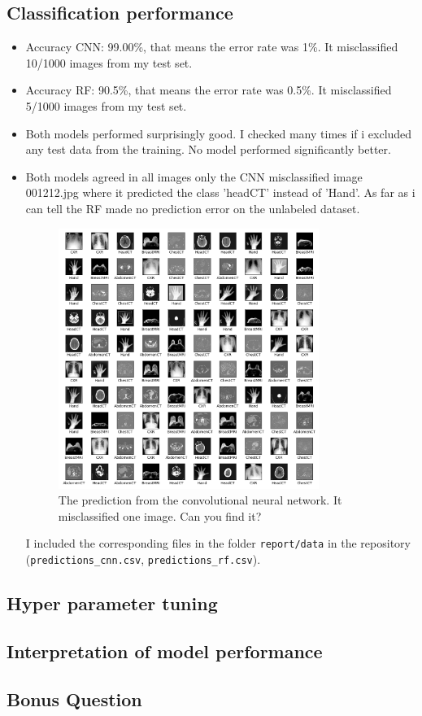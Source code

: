 \documentclass[]{article}
\begin{document}
	\subsection{Classification performance}
	\begin{itemize}
		\item Accuracy CNN: 99.00\%, that means the error rate was 1\%. It misclassified 10/1000 images from my test set.
		\item Accuracy RF: 90.5\%, that means the error rate was 0.5\%. It misclassified 5/1000 images from my test set.
		\item Both models performed surprisingly good. I checked many times if i excluded any test data from the training. No model performed significantly better.
		\item Both models agreed in all images only the CNN misclassified image 001212.jpg where it predicted the class 'headCT' instead of 'Hand'. As far as i can tell the RF made no prediction error on the unlabeled dataset.
		\begin{figure}
			\centering
			\includegraphics[width=0.8\textwidth]{images/pred_img_cnn.png}
			\caption{The prediction from the convolutional neural network. It misclassified one image. Can you find it?}
			\label{fig:pred_img}
		\end{figure}
		I included the corresponding files in the folder \texttt{report/data} in the repository (\texttt{predictions\_cnn.csv}, \texttt{predictions\_rf.csv}).
	\end{itemize}
	
	\subsection{Hyper parameter tuning}
	
	\subsection{Interpretation of model performance}
	\subsection{Bonus Question}
\end{document}
